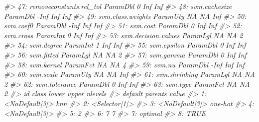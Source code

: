 \documentclass[
  11pt,
  ignorenonframetext,
  dvipsnames,UTF8]{beamer}
\newenvironment{Shaded}{\begin{snugshade}}{\end{snugshade}}
\newcommand{\CommentTok}[1]{\textcolor[rgb]{0.56,0.35,0.01}{\textit{#1}}}
\begin{document}
\begin{frame}[fragile]{}
\begin{Shaded}
\begin{Highlighting}[]
\CommentTok{\#\textgreater{} 47:             removeconstants.rel\_tol ParamDbl     0   Inf     Inf}
\CommentTok{\#\textgreater{} 48:                       svm.cachesize ParamDbl  {-}Inf   Inf     Inf}
\CommentTok{\#\textgreater{} 49:                   svm.class.weights ParamUty    NA    NA     Inf}
\CommentTok{\#\textgreater{} 50:                           svm.coef0 ParamDbl  {-}Inf   Inf     Inf}
\CommentTok{\#\textgreater{} 51:                            svm.cost ParamDbl     0   Inf     Inf}
\CommentTok{\#\textgreater{} 52:                           svm.cross ParamInt     0   Inf     Inf}
\CommentTok{\#\textgreater{} 53:                 svm.decision.values ParamLgl    NA    NA       2}
\CommentTok{\#\textgreater{} 54:                          svm.degree ParamInt     1   Inf     Inf}
\CommentTok{\#\textgreater{} 55:                         svm.epsilon ParamDbl     0   Inf     Inf}
\CommentTok{\#\textgreater{} 56:                          svm.fitted ParamLgl    NA    NA       2}
\CommentTok{\#\textgreater{} 57:                           svm.gamma ParamDbl     0   Inf     Inf}
\CommentTok{\#\textgreater{} 58:                          svm.kernel ParamFct    NA    NA       4}
\CommentTok{\#\textgreater{} 59:                              svm.nu ParamDbl  {-}Inf   Inf     Inf}
\CommentTok{\#\textgreater{} 60:                           svm.scale ParamUty    NA    NA     Inf}
\CommentTok{\#\textgreater{} 61:                       svm.shrinking ParamLgl    NA    NA       2}
\CommentTok{\#\textgreater{} 62:                       svm.tolerance ParamDbl     0   Inf     Inf}
\CommentTok{\#\textgreater{} 63:                            svm.type ParamFct    NA    NA       2}
\CommentTok{\#\textgreater{}                                      id    class lower upper nlevels}
\CommentTok{\#\textgreater{}              default           parents            value}
\CommentTok{\#\textgreater{}  1:   \textless{}NoDefault[3]\textgreater{}                                knn}
\CommentTok{\#\textgreater{}  2:    \textless{}Selector[1]\textgreater{}                                   }
\CommentTok{\#\textgreater{}  3:   \textless{}NoDefault[3]\textgreater{}                            one{-}hot}
\CommentTok{\#\textgreater{}  4:   \textless{}NoDefault[3]\textgreater{}                                   }
\CommentTok{\#\textgreater{}  5:                2                                   }
\CommentTok{\#\textgreater{}  6:                7                                  7}
\CommentTok{\#\textgreater{}  7:          optimal                                   }
\CommentTok{\#\textgreater{}  8:             TRUE                                   }

\end{Highlighting}
\end{Shaded}
\end{frame}
\end{document}
